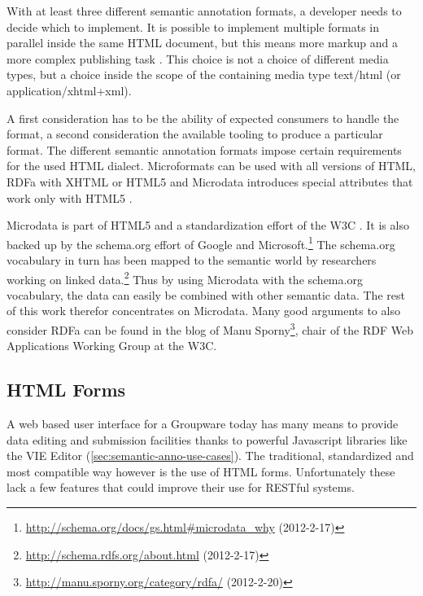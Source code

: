 \documentclass[11pt,a4paper,headsepline,twoside]{scrartcl}		%
\newcommand{\citeurl}[2]{\url{#1} (#2)}
\begin{document}
With at least three different semantic annotation formats, a developer needs to
decide which to implement. It is possible to implement multiple formats in
parallel inside the same HTML document, but this means more markup and a more
complex publishing task \cite{Tennison2012}. This choice is not a choice of
different media types, but a choice inside the scope of the containing media type
text/html (or application/xhtml+xml).

A first consideration has to be the ability of expected consumers to handle the
format, a second consideration the available tooling to produce a particular
format. The different semantic annotation formats impose certain requirements
for the used HTML dialect. Microformats can be used with all versions of HTML,
RDFa with XHTML or HTML5 and Microdata introduces special attributes that work
only with HTML5 \cite{Tennison2012}.

Microdata is part of HTML5 and a standardization effort of the W3C
\cite{Hickson2011}.  It is also backed up by the schema.org effort of Google and
Microsoft.\footnote{\citeurl{http://schema.org/docs/gs.html\#microdata_why}{2012-2-17}}
The schema.org vocabulary in turn has been mapped to the semantic world by
researchers working on linked
data.\footnote{\citeurl{http://schema.rdfs.org/about.html}{2012-2-17}} Thus by
using Microdata with the schema.org vocabulary, the data can easily be combined
with other semantic data. The rest of this work therefor concentrates on
Microdata. Many good arguments to also consider RDFa can be found in the blog of
Manu
Sporny\footnote{\citeurl{http://manu.sporny.org/category/rdfa/}{2012-2-20}},
chair of the RDF Web Applications Working Group at the W3C.


\subsection{HTML Forms}
\label{sec:html-forms}


A web based user interface for a Groupware today has many means to provide data
editing and submission facilities thanks to powerful Javascript libraries like
the VIE Editor (\autoref{sec:semantic-anno-use-cases}). The traditional,
standardized and most compatible way however is the use of HTML
forms. Unfortunately these lack a few features that could improve their use for
RESTful systems.
\end{document}
